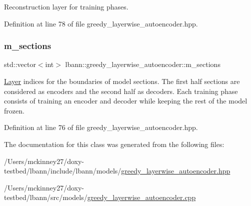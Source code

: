 Reconstruction layer for training phases. 

Definition at line 78 of file greedy\+\_\+layerwise\+\_\+autoencoder.\+hpp.

\mbox{\label{classlbann_1_1greedy__layerwise__autoencoder_aacb3dbf01c38f46a32927722420c5d41}} 
\subsubsection{\texorpdfstring{m\+\_\+sections}{m\_sections}}
{\footnotesize\ttfamily std\+::vector$<$int$>$ lbann\+::greedy\+\_\+layerwise\+\_\+autoencoder\+::m\+\_\+sections\hspace{0.3cm}{\ttfamily [protected]}}

\hyperlink{classlbann_1_1Layer}{Layer} indices for the boundaries of model sections. The first half sections are considered as encoders and the second half as decoders. Each training phase consists of training an encoder and decoder while keeping the rest of the model frozen. 

Definition at line 76 of file greedy\+\_\+layerwise\+\_\+autoencoder.\+hpp.



The documentation for this class was generated from the following files\+:\begin{DoxyCompactItemize}
\item 
/\+Users/mckinney27/doxy-\/testbed/lbann/include/lbann/models/\hyperlink{greedy__layerwise__autoencoder_8hpp}{greedy\+\_\+layerwise\+\_\+autoencoder.\+hpp}\item 
/\+Users/mckinney27/doxy-\/testbed/lbann/src/models/\hyperlink{greedy__layerwise__autoencoder_8cpp}{greedy\+\_\+layerwise\+\_\+autoencoder.\+cpp}\end{DoxyCompactItemize}
